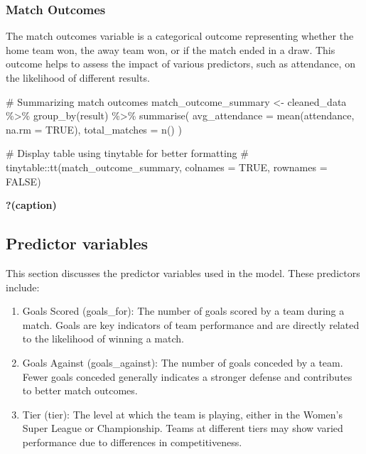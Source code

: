 \documentclass[
  letterpaper,
  DIV=11,
  numbers=noendperiod]{scrartcl}
\newenvironment{Shaded}{\begin{snugshade}}{\end{snugshade}}
\newcommand{\AttributeTok}[1]{\textcolor[rgb]{0.40,0.45,0.13}{#1}}
\newcommand{\CommentTok}[1]{\textcolor[rgb]{0.37,0.37,0.37}{#1}}
\newcommand{\ConstantTok}[1]{\textcolor[rgb]{0.56,0.35,0.01}{#1}}
\newcommand{\FunctionTok}[1]{\textcolor[rgb]{0.28,0.35,0.67}{#1}}
\newcommand{\NormalTok}[1]{\textcolor[rgb]{0.00,0.23,0.31}{#1}}
\newcommand{\OtherTok}[1]{\textcolor[rgb]{0.00,0.23,0.31}{#1}}
\newcommand{\SpecialCharTok}[1]{\textcolor[rgb]{0.37,0.37,0.37}{#1}}
\begin{document}
\hypertarget{match-outcomes}{%
\subsubsection{Match Outcomes}\label{match-outcomes}}

The match outcomes variable is a categorical outcome representing
whether the home team won, the away team won, or if the match ended in a
draw. This outcome helps to assess the impact of various predictors,
such as attendance, on the likelihood of different results.

\begin{Shaded}
\begin{Highlighting}[]
\CommentTok{\# Summarizing match outcomes}
\NormalTok{match\_outcome\_summary }\OtherTok{\textless{}{-}}\NormalTok{ cleaned\_data }\SpecialCharTok{\%\textgreater{}\%}
  \FunctionTok{group\_by}\NormalTok{(result) }\SpecialCharTok{\%\textgreater{}\%}
  \FunctionTok{summarise}\NormalTok{(}
    \AttributeTok{avg\_attendance =} \FunctionTok{mean}\NormalTok{(attendance, }\AttributeTok{na.rm =} \ConstantTok{TRUE}\NormalTok{),}
    \AttributeTok{total\_matches =} \FunctionTok{n}\NormalTok{()}
\NormalTok{  )}

\CommentTok{\# Display table using tinytable for better formatting}
\CommentTok{\# tinytable::tt(match\_outcome\_summary, colnames = TRUE, rownames = FALSE)}
\end{Highlighting}
\end{Shaded}

\begin{table}

\caption{\textbf{?(caption)}}

\end{table}

\hypertarget{predictor-variables}{%
\subsection{Predictor variables}\label{predictor-variables}}

This section discusses the predictor variables used in the model. These
predictors include:

\begin{enumerate}
\def\labelenumi{\arabic{enumi}.}
\item
  Goals Scored (goals\_for): The number of goals scored by a team during
  a match. Goals are key indicators of team performance and are directly
  related to the likelihood of winning a match.
\item
  Goals Against (goals\_against): The number of goals conceded by a
  team. Fewer goals conceded generally indicates a stronger defense and
  contributes to better match outcomes.
\item
  Tier (tier): The level at which the team is playing, either in the
  Women's Super League or Championship. Teams at different tiers may
  show varied performance due to differences in competitiveness.
\end{enumerate}
\end{document}
